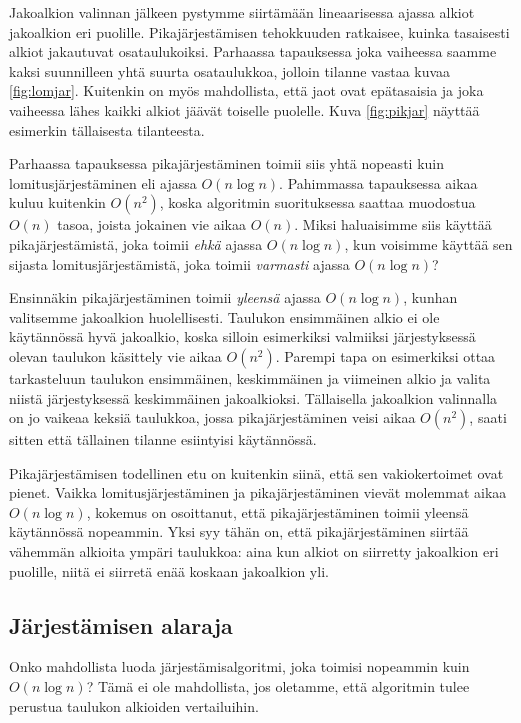 Jakoalkion valinnan jälkeen pystymme siirtämään lineaarisessa ajassa
alkiot jakoalkion eri puolille.
Pikajärjestämisen tehokkuuden ratkaisee, kuinka tasaisesti
alkiot jakautuvat osataulukoiksi.
Parhaassa tapauksessa joka vaiheessa saamme kaksi suunnilleen
yhtä suurta osataulukkoa, jolloin tilanne vastaa kuvaa \ref{fig:lomjar}.
Kuitenkin on myös mahdollista, että jaot ovat epätasaisia ja
joka vaiheessa lähes kaikki alkiot jäävät toiselle puolelle.
Kuva \ref{fig:pikjar} näyttää esimerkin tällaisesta tilanteesta.

Parhaassa tapauksessa pikajärjestäminen toimii siis yhtä nopeasti
kuin lomitusjärjestäminen eli ajassa $O(n \log n)$.
Pahimmassa tapauksessa aikaa kuluu kuitenkin $O(n^2)$,
koska algoritmin suorituksessa saattaa muodostua $O(n)$ tasoa,
joista jokainen vie aikaa $O(n)$.
Miksi haluaisimme siis käyttää pikajärjestämistä,
joka toimii \emph{ehkä} ajassa $O(n \log n)$,
kun voisimme käyttää sen sijasta lomitusjärjestämistä,
joka toimii \emph{varmasti} ajassa $O(n \log n)$?

Ensinnäkin pikajärjestäminen toimii \emph{yleensä}
ajassa $O(n \log n)$, kunhan valitsemme jakoalkion huolellisesti.
Taulukon ensimmäinen alkio ei ole käytän\-nössä hyvä jakoalkio,
koska silloin esimerkiksi valmiiksi järjestyksessä olevan
taulukon käsittely vie aikaa $O(n^2)$.
Parempi tapa on esimerkiksi ottaa tarkasteluun taulukon ensimmäinen,
keskimmäinen ja viimeinen alkio ja valita niistä
järjestyksessä keskimmäinen jakoalkioksi.
Tällaisella jakoalkion valinnalla on jo vaikeaa keksiä taulukkoa,
jossa pikajärjestäminen veisi aikaa $O(n^2)$,
saati sitten että tällainen tilanne esiintyisi käytännössä.

Pikajärjestämisen todellinen etu on kuitenkin siinä,
että sen vakiokertoimet ovat pienet.
Vaikka lomitusjärjestäminen ja pikajärjestäminen vievät molemmat
aikaa $O(n \log n)$, kokemus on osoittanut, että
pikajärjestäminen toimii yleensä käytännössä nopeammin.
Yksi syy tähän on, että pikajärjestä\-minen siirtää vähemmän
alkioita ympäri taulukkoa: aina kun alkiot on siirretty
jakoalkion eri puolille, niitä ei siirretä enää koskaan
jakoalkion yli.

\subsection{Järjestämisen alaraja}

Onko mahdollista luoda järjestämisalgoritmi, joka toimisi
nopeammin kuin $O(n \log n)$?
Tämä ei ole mahdollista, jos oletamme, että algoritmin
tulee perustua taulukon alkioiden vertailuihin.

